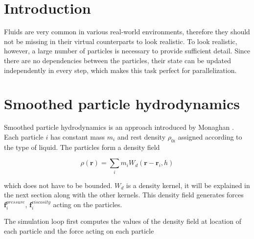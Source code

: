 \documentclass[a4paper,report]{IEEEtran}
\begin{document}


%
\IEEEpeerreviewmaketitle
 
\section{Introduction}
Fluids are very common in various real-world environments, therefore they should not be missing in their virtual counterparts to look realistic. To look realistic, however, a large number of particles is necessary to provide sufficient detail. Since there are no dependencies between the particles, their state can be updated independently in every step, which makes this task perfect for parallelization. 

\section{Smoothed particle hydrodynamics}
Smoothed particle hydrodynamics is an approach introduced by Monaghan \cite{Articles:Monaghan}.
Each particle $i$ has constant mass $m_{i}$ and rest density $\rho_{0i}$ assigned according to the type of liquid. The particles form a density field

\begin{equation}
	\rho(\mathbf{r}) = \sum_{i} m_{i}W_d(\mathbf{r}-\mathbf{r}_i, h)
\end{equation}

which does not have to be bounded. $W_d$ is a density kernel, it will be explained in the next section along with the other kernels. This density field generates forces $\mathbf{f}_{i}^{pressure}$, $\mathbf{f}_{i}^{viscosity}$ acting on the particles. 

The simulation loop first computes the values of the density field at location of each particle and the force acting on each particle
\end{document}
